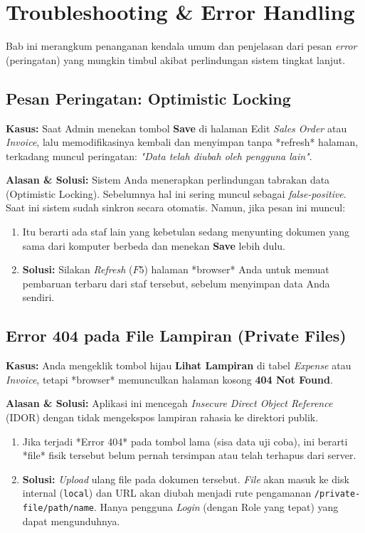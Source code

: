 \chapter{Troubleshooting \& Error Handling}

Bab ini merangkum penanganan kendala umum dan penjelasan dari pesan \textit{error} (peringatan) yang mungkin timbul akibat perlindungan sistem tingkat lanjut.

\section{Pesan Peringatan: Optimistic Locking}
\textbf{Kasus:} Saat Admin menekan tombol \textbf{Save} di halaman Edit \textit{Sales Order} atau \textit{Invoice}, lalu memodifikasinya kembali dan menyimpan tanpa *refresh* halaman, terkadang muncul peringatan: \textit{"Data telah diubah oleh pengguna lain"}.

\textbf{Alasan \& Solusi:}
Sistem Anda menerapkan perlindungan tabrakan data (Optimistic Locking). Sebelumnya hal ini sering muncul sebagai \textit{false-positive}. Saat ini sistem sudah sinkron secara otomatis. Namun, jika pesan ini muncul:
\begin{enumerate}
    \item Itu berarti ada staf lain yang kebetulan sedang menyunting dokumen yang sama dari komputer berbeda dan menekan \textbf{Save} lebih dulu.
    \item \textbf{Solusi:} Silakan \textit{Refresh} ($F5$) halaman *browser* Anda untuk memuat pembaruan terbaru dari staf tersebut, sebelum menyimpan data Anda sendiri.
\end{enumerate}

\section{Error 404 pada File Lampiran (Private Files)}
\textbf{Kasus:} Anda mengeklik tombol hijau \textbf{Lihat Lampiran} di tabel \textit{Expense} atau \textit{Invoice}, tetapi *browser* memunculkan halaman kosong \textbf{404 Not Found}.

\textbf{Alasan \& Solusi:}
Aplikasi ini mencegah \textit{Insecure Direct Object Reference} (IDOR) dengan tidak mengekspos lampiran rahasia ke direktori publik.
\begin{enumerate}
    \item Jika terjadi *Error 404* pada tombol lama (sisa data uji coba), ini berarti *file* fisik tersebut belum pernah tersimpan atau telah terhapus dari server.
    \item \textbf{Solusi:} \textit{Upload} ulang file pada dokumen tersebut. \textit{File} akan masuk ke disk internal (\texttt{local}) dan URL akan diubah menjadi rute pengamanan \texttt{/private-file/path/name}. Hanya pengguna \textit{Login} (dengan Role yang tepat) yang dapat mengunduhnya.
\end{enumerate}

